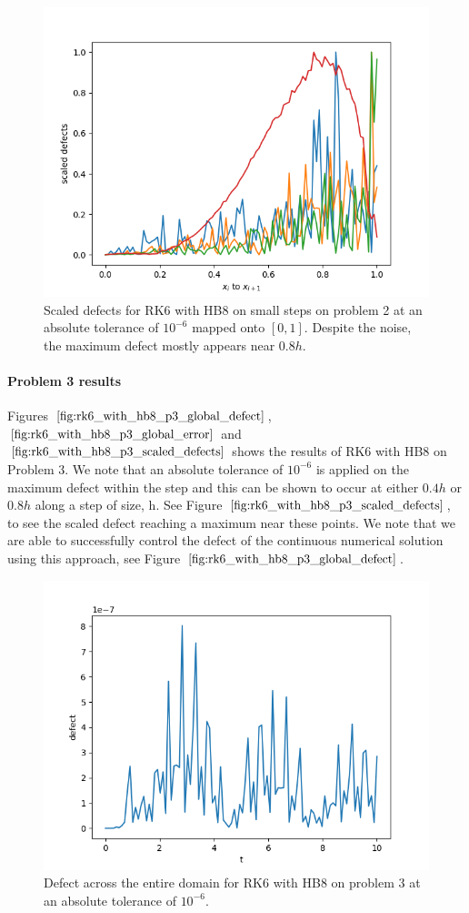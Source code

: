 \begin{figure}[H]
\centering
\includegraphics[width=0.7\linewidth]{./figures/rk6_with_hb8_p2_scaled_defects_small_steps}
\caption{Scaled defects for RK6 with HB8 on small steps on problem 2 at an absolute tolerance of $10^{-6}$ mapped onto $[0, 1]$. Despite the noise, the maximum defect mostly appears near $0.8h$.}
\label{fig:rk6_with_hb8_p2_scaled_defects_small_steps}
\end{figure}

\paragraph{Problem 3 results}
Figures $\ref{fig:rk6_with_hb8_p3_global_defect}$, $\ref{fig:rk6_with_hb8_p3_global_error}$ and $\ref{fig:rk6_with_hb8_p3_scaled_defects}$ shows the results of RK6 with HB8 on Problem 3. 
We note that an absolute tolerance of $10^{-6}$ is applied on the maximum defect within the step and this can be shown to occur at either $0.4h$ or $0.8h$ along a step of size, h. See Figure $\ref{fig:rk6_with_hb8_p3_scaled_defects}$, to see the scaled defect reaching a maximum near these points. We note that we are able to successfully control the defect of the continuous numerical solution using this approach, see Figure $\ref{fig:rk6_with_hb8_p3_global_defect}$. 
 

\begin{figure}[H]
\centering
\includegraphics[width=0.7\linewidth]{./figures/rk6_with_hb8_p3_global_defect}
\caption{Defect across the entire domain for RK6 with HB8 on problem 3 at an absolute tolerance of $10^{-6}$.}
\label{fig:rk6_with_hb8_p3_global_defect}
\end{figure}

